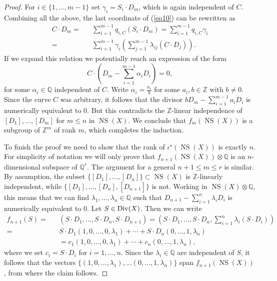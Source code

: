 \documentclass[12pt]{amsart}
\theoremstyle{remark}
\newcommand{\Q}{{\mathbb Q}}
\newcommand{\Z}{{\mathbb Z}}
\renewcommand{\1}{{\mathbb{S}}}
\newcommand{\Div}{{\rm Div}}
\newcommand{\NS}{{\operatorname{NS}}}
\newcommand{\<}{\langle}
\renewcommand{\>}{\rangle}
\begin{document}
\begin{proof}
For $i\in\{1,\ldots, m-1\}$ set $\gamma_i=S_i\cdot D_m$, which is again independent of $C$. 
Combining all the above, the last coordinate of (\ref{eq10}) can be rewritten as 
\begin{eqnarray*}
 C\cdot D_m=&&\sum_{i=1}^{m-1} q_{i,C}(S_i\cdot D_m)=\sum_{i=1}^{m-1} q_{i,C}\gamma_i\\
 =&&\sum_{i=1}^{m-1}\gamma_i\left(\sum_{j=1}^{m-1}\lambda_{ij} (C\cdot D_j)\right).
\end{eqnarray*}
If we expand this relation we potentially reach an expression of the form
\[C\cdot\left(D_m-\sum_{i=1}^{m-1}\alpha_i D_i\right)=0,\] for some $\alpha_i\in\Q$ independent of $C$. Write $\alpha_i=\frac{a_i}{b}$ for some $a_i, b\in\Z$ with $b\neq 0$. Since the curve $C$ was arbitrary, it follows that the divisor $\displaystyle bD_m-\sum_{i=1}^{m-1}a_i D_i$ is numerically equivalent to $0$. But this contradicts the $\Z$-linear independence of $[D_1],\ldots, [D_m]$ for $m\leq n$ in $\NS(X)$. We conclude that $f_m(\NS(X))$ is a subgroup of $\Z^m$ of rank $m$, which completes the induction.




To finish the proof we need to show that the rank of $\iota^\star(\NS(X))$ is exactly $n$. For simplicity of notation we will only prove that $f_{n+1}(\NS(X))\otimes\Q$ is an $n$-dimensional subspace of $\Q^{r}$. The argument for a general $n+1\leq m\leq r$ is similar. By assumption, the subset $\{[D_1],\ldots, [D_n]\}\subset\NS(X)$ is $\Z$-linearly independent, while $\{[D_1],\ldots, [D_n], [D_{n+1}]\}$ is not. Working in $\NS(X)\otimes\Q$, this means that we can find $\lambda_1,\ldots, \lambda_n\in\Q$ such that $\displaystyle D_{n+1}-\sum_{i=1}^n \lambda_i D_i$ is numerically equivalent to $0$. Let $S\in\Div(X)$.  Then we can write
\begin{eqnarray*}
    f_{n+1}(S)=&&(S\cdot D_1,\ldots, S\cdot D_n, S\cdot D_{n+1})=\left(S\cdot D_1,\ldots, S\cdot D_n, \sum_{i=1}^n \lambda_i (S\cdot D_{i})\right)\\
    =&& S\cdot D_1(1,0,\ldots, 0, \lambda_1)+\cdots + S\cdot D_n (0,\ldots, 1, \lambda_n)\\
    &&=c_1(1,0,\ldots, 0, \lambda_1)+\cdots+c_n(0,\ldots, 1, \lambda_n),
\end{eqnarray*} where we set $c_i=S\cdot D_i$ for $i=1,\ldots, n$. Since the $\lambda_i\in\Q$ are independent of $S$, it follows that the vectors $\{(1,0,\ldots, \lambda_1),\ldots (0,\ldots, 1, \lambda_n)\}$ span $f_{n+1}(\NS(X))$, from where the claim follows. 




\end{proof}
\end{document}

